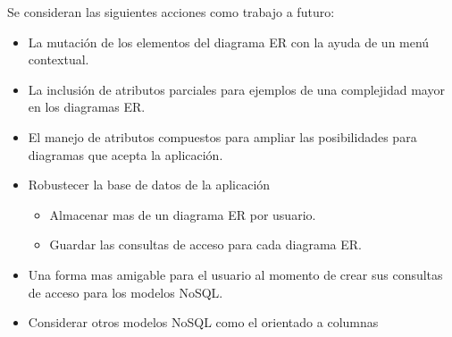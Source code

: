 Se consideran las siguientes acciones como trabajo a futuro:

\begin{itemize}
  \item La mutación de los elementos del diagrama ER con la ayuda de un menú contextual.
  \item La inclusión de atributos parciales para ejemplos de una complejidad mayor en los diagramas ER.
  \item El manejo de atributos compuestos para ampliar las posibilidades para diagramas que acepta la aplicación.
  \item Robustecer la base de datos de la aplicación
  \begin{itemize}
    \item Almacenar mas de un diagrama ER por usuario.
    \item Guardar las consultas de acceso para cada diagrama ER.
  \end{itemize}
  \item Una forma mas amigable para el usuario al momento de crear sus consultas de acceso para los modelos NoSQL.
  \item Considerar otros modelos NoSQL como el orientado a columnas
\end{itemize}